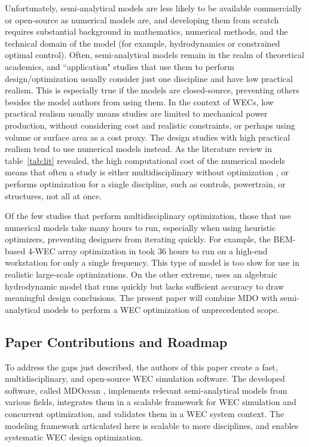 Unfortunately, semi-analytical models are less likely to be available commercially or open-source as numerical models are, and developing them from scratch requires substantial background in mathematics, numerical methods, and the technical domain of the model (for example, hydrodynamics or constrained optimal control).
Often, semi-analytical models remain in the realm of theoretical academics, and ``application" studies that use them to perform design/optimization usually consider just one discipline and have low practical realism.
This is especially true if the models are closed-source, preventing others besides the model authors from using them.
In the context of WECs, low practical realism usually means studies are limited to mechanical power production, without considering cost and realistic constraints, or perhaps using volume or surface area as a cost proxy.
The design studies with high practical realism tend to use numerical models instead.
As the literature review in table~\ref{tab:lit} revealed, the high computational cost of the numerical models means that often a study is either multidisciplinary without optimization \cite{RM3,mi_multi-scale_2025}, or performs optimization for a single discipline, such as controls, powertrain, or structures, not all at once. 

Of the few studies that perform multidisciplinary optimization, those that use numerical models take many hours to run, especially when using heuristic optimizers, preventing designers from iterating quickly.
For example, the BEM-based 4-WEC array optimization in \cite{khanal_multi-objective_2024} took 36 hours to run on a high-end workstation for only a single frequency.
This type of model is too slow for use in realistic large-scale optimizations.
On the other extreme, \cite{mccabe_multidisciplinary_2022} uses an algebraic hydrodynamic model that runs quickly but lacks sufficient accuracy to draw meaningful design conclusions.
The present paper will combine MDO with semi-analytical models to perform a WEC optimization of unprecedented scope.

\subsection{Paper Contributions and Roadmap}
To address the gaps just described, the authors of this paper create a fast, multidisciplinary, and open-source WEC simulation software.
The developed software, called MDOcean \cite{mccabe_mdocean_2024}, implements relevant semi-analytical models from various fields, integrates them in a scalable framework for WEC simulation and concurrent optimization, and validates them in a WEC system context.
The modeling framework articulated here is scalable to more disciplines, and enables systematic WEC design optimization.

